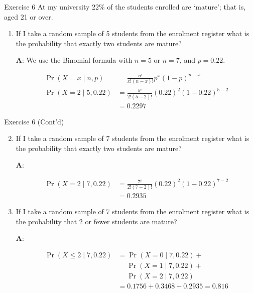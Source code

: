 \documentclass[
  ignorenonframetext,
  aspectratio=43,
]{beamer}
\let\olditem\item
\renewcommand\item{\olditem\justifying}
\begin{document}
\begin{frame}{Exercise 6}
\protect\hypertarget{exercise-6}{}
At my university 22\% of the students enrolled are `mature'; that is,
aged 21 or over.

\begin{enumerate}
\item
  If I take a random sample of 5 students from the enrolment register
  what is the probability that exactly two students are mature?

  \pause

  \textbf{A}: We use the Binomial formula with \(n = 5\) or \(n = 7\),
  and \(p = 0.22\). \vspace{-30pt}

  \[
  \begin{aligned}
  \Pr(X = x \mid n, p) &= \frac{n!}{x!(n - x)!} p^x (1 - p)^{n - x} \\
  \Pr(X = 2 \mid 5, 0.22) &= \frac{5!}{2!(5 - 2)!} (0.22)^2 (1 - 0.22)^{5 - 2} \\ 
                          &= 0.2297
  \end{aligned}
  \]
\end{enumerate}
\end{frame}

\begin{frame}{Exercise 6 (Cont'd)}
\protect\hypertarget{exercise-6-contd}{}
\vspace{17pt}

\begin{enumerate}
\setcounter{enumi}{1}
\item
  If I take a random sample of 7 students from the enrolment register
  what is the probability that exactly two students are mature?

  \pause

  \textbf{A}: \vspace{-20pt}

  \[
  \begin{aligned}
  \Pr(X = 2 \mid 7, 0.22) &= \frac{7!}{2!(7 - 2)!} (0.22)^2 (1 - 0.22)^{7 - 2} \\
                          &= 0.2935
  \end{aligned}
  \]
\item
  If I take a random sample of 7 students from the enrolment register
  what is the probability that 2 or fewer students are mature?

  \pause

  \textbf{A}: \vspace{-20pt}

  \[
  \begin{aligned}
  \Pr(X \le 2 \mid 7, 0.22) &= \Pr(X = 0 \mid 7, 0.22) + \\
                            & \quad \; \Pr(X = 1 \mid 7, 0.22) + \\
                            & \quad \; \Pr(X = 2 \mid 7, 0.22) \\
                            &= 0.1756 + 0.3468 + 0.2935 = 0.816
  \end{aligned}
  \]
\end{enumerate}
\end{frame}
\end{document}
